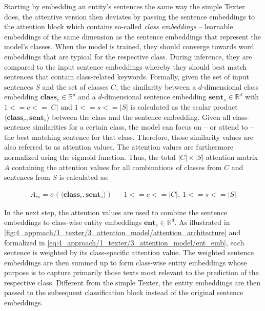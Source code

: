Starting by embedding an entity's sentences the same way the simple Texter does, the attentive version then deviates by passing the sentence embeddings to the attention block which contains so-called \emph{class embeddings} -- learnable embeddings of the same dimension as the sentence embeddings that represent the model's classes. When the model is trained, they should converge towards word embeddings that are typical for the respective class. During inference, they are compared to the input sentence embeddings whereby they should best match sentences that contain class-related keywords. Formally, given the set of input sentences $S$ and the set of classes $C$, the similarity between a $d$-dimensional class embedding $\textbf{class}_c \in \mathbb{R}^d$ and a $d$-dimensional sentence embedding $\textbf{sent}_s \in \mathbb{R}^d$ with $1 <= c <= |C|$ and $1 <= s <= |S|$ is calculated as the scalar product $\langle \textbf{class}_c, \textbf{sent}_s \rangle$ between the class and the sentence embedding. Given all class-sentence similarities for a certain class, the model can focus on -- or attend to -- the best matching sentence for that class. Therefore, those similarity values are also referred to as attention values. The attention values are furthermore normalized using the sigmoid function. Thus, the total $|C| \times |S|$ attention matrix $A$ containing the attention values for all combinations of classes from $C$ and sentences from $S$ is calculated as:

\begin{align}
    A_{cs} = \sigma(\langle \textbf{class}_c , \textbf{sent}_s \rangle) && 1 <= c <= |C|,~1 <= s <= |S|
    \label{eq:4_approach/1_texter/3_attention_model/attention_matrix}
\end{align}

In the next step, the attention values are used to combine the sentence embeddings to class-wise entity embeddings $\textbf{ent}_c \in \mathbb{R}^d$. As illustrated in \autoref{fig:4_approach/1_texter/3_attention_model/attention_architecture} and formalized in \autoref{eq:4_approach/1_texter/3_attention_model/ent_emb}, each sentence is weighted by its class-specific attention value. The weighted sentence embeddings are then summed up to form class-wise entity embeddings whose purpose is to capture primarily those texts most relevant to the prediction of the respective class. Different from the simple Texter, the entity embeddings are then passed to the subsequent classification block instead of the original sentence embeddings.

